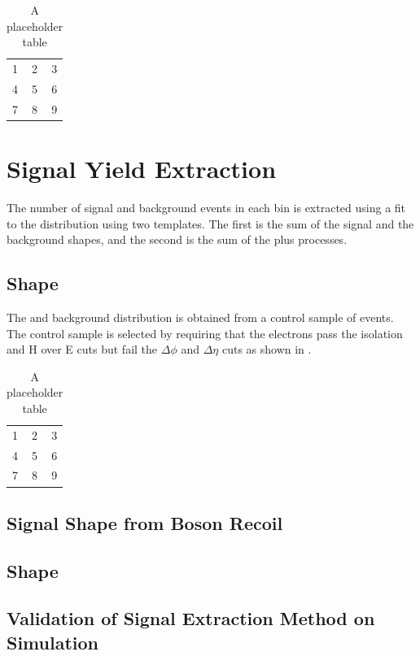 \begin{table}[htb]
  \centering
  \begin{tabular}{| l c r |}
    \hline
    1 & 2 & 3 \\
    4 & 5 & 6 \\
    7 & 8 & 9 \\
  \hline
  \end{tabular}
  \caption{A placeholder table}
  \label{asym36:selectedcomp}
\end{table}


\section{Signal Yield Extraction}

The number of signal and background events in each bin is extracted using a fit
to the \ETm distribution using two templates.
The first is the sum of the \Wenu signal and the \EWK background shapes,
and the second is the sum of the \QCD plus \gjet processes.

\subsection{\QCD \ETm Shape}

The \QCD and \gjet background distribution is obtained from a control sample of
events. The control sample is selected by requiring that the electrons pass the
isolation and H over E cuts but fail the $\Delta\phi$ and $\Delta\eta$ cuts as
shown in .

\begin{table}[htb]
  \centering
  \begin{tabular}{| l c r |}
    \hline
    1 & 2 & 3 \\
    4 & 5 & 6 \\
    7 & 8 & 9 \\
  \hline
  \end{tabular}
  \caption{A placeholder table}
  \label{asym36:antisel}
\end{table}

\subsection{Signal \ETm Shape from Boson Recoil}
\subsection{\EWK \ETm Shape}
\subsection{Validation of Signal Extraction Method on Simulation}
